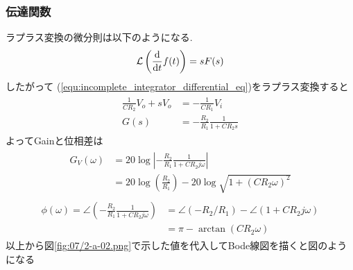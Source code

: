 \subsubsection{伝達関数}
ラプラス変換の微分則は以下のようになる.
\begin{align}
  \mathcal{L}\left(\frac{\rm d}{{\rm d}t}f(t)\right)=sF(s)
\end{align}
したがって
(\ref{equ:incomplete_integrator_differential_eq})をラプラス変換すると
\begin{align}
  \begin{split}
    \frac{1}{CR_2}V_o+sV_o&=-\frac{1}{CR_1}V_i\\
    G(s)&=-\frac{R_2}{R_1}\frac{1}{1+CR_2s}
  \end{split}
\end{align}
よってGainと位相差は
\begin{align}
  \begin{split}
    G_V(\omega)&=20\log\left|-\frac{R_2}{R_1}\frac{1}{1+CR_2j\omega}\right|\\
    &=20\log\left(\frac{R_2}{R_1}\right)-20\log\sqrt{1+(CR_2\omega)^2}
  \end{split}
\end{align}
\begin{align}
  \begin{split}
    \phi(\omega)=\angle\left(-\frac{R_2}{R_1}\frac{1}{1+CR_2j\omega}\right)
    &=\angle(-R_2/R_1)-\angle(1+CR_2j\omega)\\
    &=\pi-\arctan(CR_2\omega)
  \end{split}
\end{align}
以上から図\ref{fig:07/2-a-02.png}で示した値を代入してBode線図を描くと図のようになる